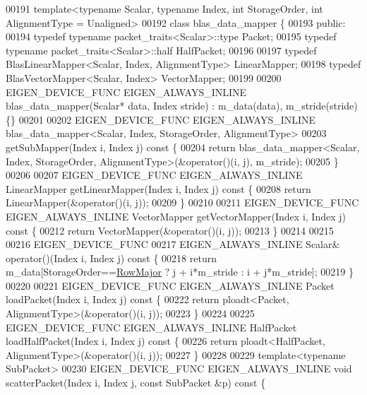 \begin{DoxyCode}
00191 \textcolor{keyword}{template}<\textcolor{keyword}{typename} Scalar, \textcolor{keyword}{typename} Index, \textcolor{keywordtype}{int} StorageOrder, \textcolor{keywordtype}{int} AlignmentType = Unaligned>
00192 \textcolor{keyword}{class }blas\_data\_mapper \{
00193   \textcolor{keyword}{public}:
00194   \textcolor{keyword}{typedef} \textcolor{keyword}{typename} packet\_traits<Scalar>::type Packet;
00195   \textcolor{keyword}{typedef} \textcolor{keyword}{typename} packet\_traits<Scalar>::half HalfPacket;
00196 
00197   \textcolor{keyword}{typedef} BlasLinearMapper<Scalar, Index, AlignmentType> LinearMapper;
00198   \textcolor{keyword}{typedef} BlasVectorMapper<Scalar, Index> VectorMapper;
00199 
00200   EIGEN\_DEVICE\_FUNC EIGEN\_ALWAYS\_INLINE blas\_data\_mapper(Scalar* data, Index stride) : m\_data(data), 
      m\_stride(stride) \{\}
00201 
00202   EIGEN\_DEVICE\_FUNC  EIGEN\_ALWAYS\_INLINE blas\_data\_mapper<Scalar, Index, StorageOrder, AlignmentType>
00203   getSubMapper(Index i, Index j)\textcolor{keyword}{ const }\{
00204     \textcolor{keywordflow}{return} blas\_data\_mapper<Scalar, Index, StorageOrder, AlignmentType>(&operator()(i, j), m\_stride);
00205   \}
00206 
00207   EIGEN\_DEVICE\_FUNC  EIGEN\_ALWAYS\_INLINE LinearMapper getLinearMapper(Index i, Index j)\textcolor{keyword}{ const }\{
00208     \textcolor{keywordflow}{return} LinearMapper(&\textcolor{keyword}{operator}()(i, j));
00209   \}
00210 
00211   EIGEN\_DEVICE\_FUNC  EIGEN\_ALWAYS\_INLINE VectorMapper getVectorMapper(Index i, Index j)\textcolor{keyword}{ const }\{
00212     \textcolor{keywordflow}{return} VectorMapper(&\textcolor{keyword}{operator}()(i, j));
00213   \}
00214 
00215 
00216   EIGEN\_DEVICE\_FUNC
00217   EIGEN\_ALWAYS\_INLINE Scalar& operator()(Index i, Index j)\textcolor{keyword}{ const }\{
00218     \textcolor{keywordflow}{return} m\_data[StorageOrder==\hyperlink{group__enums_ggaacded1a18ae58b0f554751f6cdf9eb13acfcde9cd8677c5f7caf6bd603666aae3}{RowMajor} ? j + i*m\_stride : i + j*m\_stride];
00219   \}
00220 
00221   EIGEN\_DEVICE\_FUNC EIGEN\_ALWAYS\_INLINE Packet loadPacket(Index i, Index j)\textcolor{keyword}{ const }\{
00222     \textcolor{keywordflow}{return} ploadt<Packet, AlignmentType>(&operator()(i, j));
00223   \}
00224 
00225   EIGEN\_DEVICE\_FUNC EIGEN\_ALWAYS\_INLINE HalfPacket loadHalfPacket(Index i, Index j)\textcolor{keyword}{ const }\{
00226     \textcolor{keywordflow}{return} ploadt<HalfPacket, AlignmentType>(&operator()(i, j));
00227   \}
00228 
00229   \textcolor{keyword}{template}<\textcolor{keyword}{typename} SubPacket>
00230   EIGEN\_DEVICE\_FUNC EIGEN\_ALWAYS\_INLINE \textcolor{keywordtype}{void} scatterPacket(Index i, Index j, \textcolor{keyword}{const} SubPacket &p)\textcolor{keyword}{ const }\{

\end{DoxyCode}
